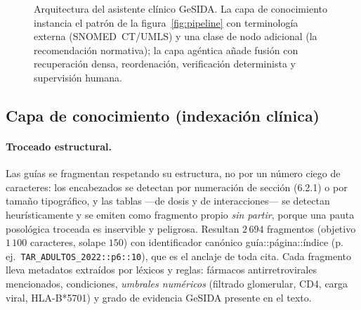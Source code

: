 \documentclass[11pt,a4paper]{article}
\begin{document}
\begin{figure}[t]
\caption{Arquitectura del asistente clínico GeSIDA. La capa de conocimiento
instancia el patrón de la figura~\ref{fig:pipeline} con terminología externa
(SNOMED~CT/UMLS) y una clase de nodo adicional (la recomendación normativa);
la capa agéntica añade fusión con recuperación densa, reordenación,
verificación determinista y supervisión humana.}
\label{fig:gesida}
\end{figure}

\subsection{Capa de conocimiento (indexación clínica)}
\label{sec:gesida-index}

\paragraph{Troceado estructural.}
Las guías se fragmentan respetando su estructura, no por un número ciego de
caracteres: los encabezados se detectan por numeración de sección
(\guillemotleft{}6.2.1\guillemotright{}) o por tamaño tipográfico, y las tablas ---de dosis y de
interacciones--- se detectan heurísticamente y se emiten como fragmento
propio \emph{sin partir}, porque una pauta posológica troceada es
inservible y peligrosa. Resultan $2\,694$ fragmentos (objetivo
$1\,100$ caracteres, solape $150$) con identificador canónico
\guillemotleft{}guía::página::índice\guillemotright{} (p.\,ej.\
\texttt{TAR\_ADULTOS\_2022::p6::10}), que es el anclaje de toda cita. Cada
fragmento lleva metadatos extraídos por léxicos y reglas: fármacos
antirretrovirales mencionados, condiciones, \emph{umbrales numéricos}
(filtrado glomerular, CD4, carga viral, HLA-B*5701) y grado de evidencia
GeSIDA presente en el texto.
\end{document}
